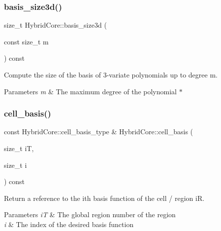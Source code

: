 \subsubsection{\texorpdfstring{basis\+\_\+size3d()}{basis\_size3d()}}
{\footnotesize\ttfamily size\+\_\+t Hybrid\+Core\+::basis\+\_\+size3d (\begin{DoxyParamCaption}\item[{const size\+\_\+t}]{m }\end{DoxyParamCaption}) const}



Compute the size of the basis of 3-\/variate polynomials up to degree m. 


\begin{DoxyParams}{Parameters}
{\em m} & The maximum degree of the polynomial $\ast$ \\
\hline
\end{DoxyParams}
\mbox{\label{classMeshFramework2D_1_1HybridCore_a34242db07cc2b3c3b867d9e4580b634d}} 
\subsubsection{\texorpdfstring{cell\+\_\+basis()}{cell\_basis()}\hspace{0.1cm}{\footnotesize\ttfamily [1/2]}}
{\footnotesize\ttfamily const Hybrid\+Core\+::cell\+\_\+basis\+\_\+type \& Hybrid\+Core\+::cell\+\_\+basis (\begin{DoxyParamCaption}\item[{size\+\_\+t}]{iT,  }\item[{size\+\_\+t}]{i }\end{DoxyParamCaption}) const}



Return a reference to the i\textquotesingle{}th basis function of the cell / region iR. 


\begin{DoxyParams}{Parameters}
{\em iT} & The global region number of the region \\
\hline
{\em i} & The index of the desired basis function \\
\hline
\end{DoxyParams}
\mbox{\label{classMeshFramework2D_1_1HybridCore_a0205f1e764a58480cca800b5b301f89e}} 
